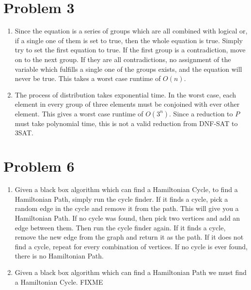 \documentclass[12pt,letterpaper]{article}
\begin{document}
\section*{Problem 3}
\begin{enumerate}[label=(\alph*)]
    \item Since the equation is a series of groups which are all combined with logical or, if a single one of them is set to true, then the whole equation is true. Simply try to set the first equation to true. If the first group is a contradiction, move on to the next group. If they are all contradictions, no assignment of the variable which fulfills a single one of the groups exists, and the equation will never be true. This takes a worst case runtime of $O(n)$.\\
    \item The process of distribution takes exponential time. In the worst case, each element in every group of three elements must be conjoined with ever other element. This gives a worst case runtime of $O(3^n)$. Since a reduction to $P$ must take polynomial time, this is not a valid reduction from DNF-SAT to 3SAT.\\
\end{enumerate}

\section*{Problem 6}
\begin{enumerate}[label=(\alph*)]
    \item Given a black box algorithm which can find a Hamiltonian Cycle, to find a Hamiltonian Path, simply run the cycle finder. If it finds a cycle, pick a random edge in the cycle and remove it from the path. This will give you a Hamiltonian Path. If no cycle was found, then pick two vertices and add an edge between them. Then run the cycle finder again. If it finds a cycle, remove the new edge from the graph and return it as the path. If it does not find a cycle, repeat for every combination of vertices. If no cycle is ever found, there is no Hamiltonian Path.\\
    \item Given a black box algorithm which can find a Hamiltonian Path we must find a Hamiltonian Cycle. FIXME
\end{enumerate}
\end{document}
